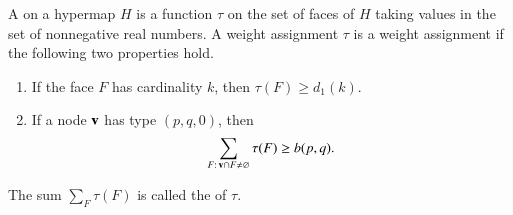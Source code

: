 \documentclass{llncs}
\begin{document}
%
%
\begin{definition}
%
  A  
on a hypermap $H$ is a
  function $\tau$ on the set of faces of $H$ taking values in the set
  of nonnegative real numbers. A weight assignment $\tau$
is a 
  weight assignment if the following two properties hold.
%
\begin{enumerate}
\item If the face $F$ has cardinality $k$, then
$\tau(F) \ge d_1(k)$.
\item If a node ${\mathbf v}$ has type $(p,q,0)$, then
  \[\sum_{F:\,{\mathbf v}\cap F\ne\varnothing} \tau(F) \ge
    b{(p,q)}.\]
\end{enumerate}
The sum $\sum_F \tau(F)$ is called the  of $\tau$.
\end{definition}
%
\end{document}
